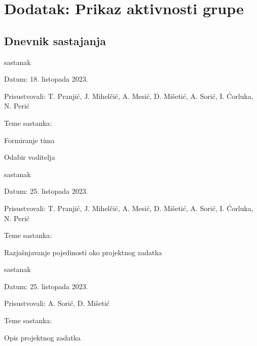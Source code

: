 \chapter*{Dodatak: Prikaz aktivnosti grupe}
		
		\section*{Dnevnik sastajanja}
		
		
		
		\begin{packed_enum}
			\item  sastanak
			
			\item[] \begin{packed_item}
				\item Datum: 18. listopada 2023.
				\item Prisustvovali: T. Pranjić, J. Mihelčić, A. Mesić, D. Mišetić, A. Sorić, I. Ćorluka, N. Perić
				\item Teme sastanka:
				\begin{packed_item}
					\item Formiranje tima
					\item Odabir voditelja
				\end{packed_item}
			\end{packed_item}
			
			\item  sastanak
			\item[] \begin{packed_item}
				\item Datum: 25. listopada 2023.
				\item Prisustvovali: T. Pranjić, J. Mihelčić, A. Mesić, D. Mišetić, A. Sorić, I. Ćorluka, N. Perić
				\item Teme sastanka:
				\begin{packed_item}
					\item  Razjašnjavanje pojedinosti oko projektnog zadatka

				\end{packed_item}
			\end{packed_item}
      
      \item  sastanak
			\item[] \begin{packed_item}
			  \item Datum: 25. listopada 2023.
				\item Prisustvovali: A. Sorić, D. Mišetić
				\item Teme sastanka:
				\begin{packed_item}
					\item  Opis projektnog zadatka
        \end{packed_item}
     \end{packed_item}
			

\end{packed_enum}
